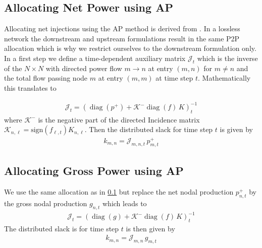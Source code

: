 \documentclass[11pt,twocolumn]{article}
\newcommand{\nodalgeneration}[1][n]{g_{#1,t}}
\newcommand{\incidence}[1][n]{K_{#1,\ell}}
\newcommand{\Slack}{k_{m,n}}
\newcommand{\flow}{f_{\ell,t}}
\newcommand{\netproduction}[1][n]{p^{+}_{#1,t}}
\newcommand{\incidenceM}{K}
\newcommand{\flowM}{f}
\newcommand{\injectionM}{p}
\newcommand{\DirectedIncidence}{\mathcal{K}}
\newcommand{\InverseAPInjection}{\mathcal{J}}
\newcommand\diag[1]{\operatorname{diag}\left(#1\right)}
\begin{document}
\subsection{Allocating Net Power using AP}
\label{sec:net_ap}

Allocating net injections using the AP method is derived from \cite{achayuthakan_electricity_2010-1}. In a lossless network the downstream and upstream formulations result in the same P2P allocation which is why we restrict ourselves to the downstream formulation only. In a first step we define a time-dependent auxiliary matrix $\InverseAPInjection_t$ which is the inverse of the $N\times N$ with directed power flow $m \rightarrow n$ at entry $(m, n)$ for $m \ne n$ and the total flow passing node $m$ at entry $\left( m, m\right)$ at time step $t$. Mathematically this translates to


\begin{align}
\InverseAPInjection_t = \left( \diag{\injectionM^+} + \DirectedIncidence^- \diag{\flowM} \, \incidenceM \right)_t^{-1} 
\end{align}
where $\DirectedIncidence^-$ is the negative part of the directed Incidence matrix $\DirectedIncidence_{n,\ell} = \text{sign}\left( \flow \right)  \incidence$. Then the distributed slack for time step $t$ is given by
\begin{align}
\Slack = \InverseAPInjection_{m,n,t} \, \netproduction[m]
\end{align}

\subsection{Allocating Gross Power using AP}
\label{sec:gross_ap}

We use the same allocation as in \cref{sec:net_ap} but replace the net nodal production $\netproduction$ by the gross nodal production $\nodalgeneration$ which leads to  
\begin{align}
\InverseAPInjection_t = \left( \diag{g} + \DirectedIncidence^- \diag{\flowM} \, \incidenceM \right)_t^{-1} 
\end{align}
The distributed slack is for time step $t$ is then given by
\begin{align}
\Slack = \InverseAPInjection_{m,n} \, \nodalgeneration[m]
\end{align}



\clearpage
\printbibliography
\end{document}
